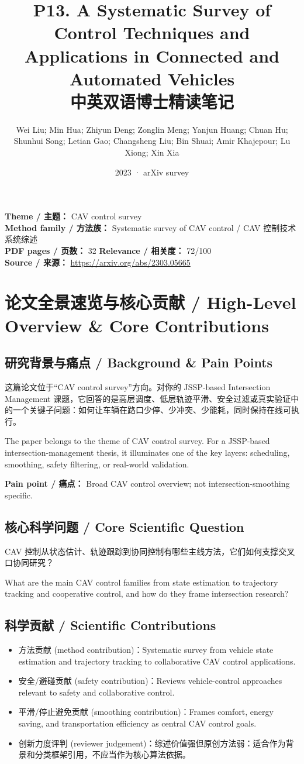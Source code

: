 \documentclass[UTF8,a4paper,11pt,fontset=fandol]{ctexart}
\title{P13. A Systematic Survey of Control Techniques and Applications in Connected and Automated Vehicles\\中英双语博士精读笔记}
\author{Wei Liu; Min Hua; Zhiyun Deng; Zonglin Meng; Yanjun Huang; Chuan Hu; Shunhui Song; Letian Gao; Changsheng Liu; Bin Shuai; Amir Khajepour; Lu Xiong; Xin Xia}
\date{2023 · arXiv survey}
\begin{document}
\maketitle

\noindent\textbf{Theme / 主题：} CAV control survey\\
\textbf{Method family / 方法族：} Systematic survey of CAV control / CAV 控制技术系统综述\\
\textbf{PDF pages / 页数：} 32 \quad
\textbf{Relevance / 相关度：} 72/100\\
\textbf{Source / 来源：} \url{https://arxiv.org/abs/2303.05665}

\section{论文全景速览与核心贡献 / High-Level Overview \& Core Contributions}
\subsection{研究背景与痛点 / Background \& Pain Points}
这篇论文位于“CAV control survey”方向。对你的 JSSP-based Intersection Management 课题，它回答的是高层调度、低层轨迹平滑、安全过滤或真实验证中的一个关键子问题：如何让车辆在路口少停、少冲突、少能耗，同时保持在线可执行。

The paper belongs to the theme of CAV control survey. For a JSSP-based intersection-management thesis, it illuminates one of the key layers: scheduling, smoothing, safety filtering, or real-world validation.

\textbf{Pain point / 痛点：} Broad CAV control overview; not intersection-smoothing specific.

\subsection{核心科学问题 / Core Scientific Question}
CAV 控制从状态估计、轨迹跟踪到协同控制有哪些主线方法，它们如何支撑交叉口协同研究？

What are the main CAV control families from state estimation to trajectory tracking and cooperative control, and how do they frame intersection research?

\subsection{科学贡献 / Scientific Contributions}
\begin{itemize}
\item 方法贡献 (method contribution)：Systematic survey from vehicle state estimation and trajectory tracking to collaborative CAV control applications.
\item 安全/避碰贡献 (safety contribution)：Reviews vehicle-control approaches relevant to safety and collaborative control.
\item 平滑/停止避免贡献 (smoothing contribution)：Frames comfort, energy saving, and transportation efficiency as central CAV control goals.
\item 创新力度评判 (reviewer judgement)：综述价值强但原创方法弱：适合作为背景和分类框架引用，不应当作为核心算法依据。
\end{itemize}
\end{document}
